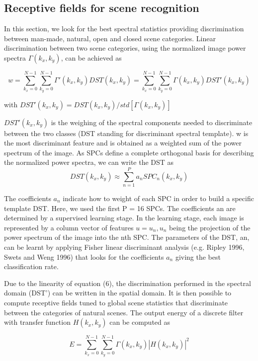 \documentclass{article}
\begin{document}
\subsection{Receptive fields for scene recognition}

In this section, we look for the best spectral statistics providing discrimination between man-made, natural, open and closed scene categories. Linear discrimination between two scene categories, using the normalized image power spectra $\Gamma(k_x, k_y)$, can be achieved as

\begin{equation}
   w = \sum^{N-1}_{k_x=0} \sum^{N-1}_{k_y=0} \Gamma'(k_x,k_y)DST(k_x,k_y) =  \sum^{N-1}_{k_x=0} \sum^{N-1}_{k_y=0} \Gamma(k_x,k_y)DST'(k_x,k_y)
\end{equation}

with $DST'(k_x,k_y)= DST(k_x,k_y)/std[\Gamma(k_x,k_y)]$

$DST'(k_x,k_y)$ is the weighing of the spectral components needed to discriminate between the two classes (DST standing for discriminant spectral template). w is the most discriminant feature and is obtained as a weighted sum of the power spectrum of the image. As SPCs define
a complete orthogonal basis for describing the normalized power spectra, we can write the DST as
\begin{equation}
    DST(k_x,k_y) \approx \sum^P_{n=1} a_n SPC_n(k_x,k_y)
\end{equation}

The coefficients $a_n$ indicate how to weight of each SPC in order to build a specific template
DST. Here, we used the first P = 16 SPCs. The coefficients an are determined by a supervised
learning stage. In the learning stage, each image is represented by a column vector of features
$u = {u_n}, u_n$ being the projection of the power spectrum of the image into the nth SPC.  The parameters of the DST, an, can be learnt by applying Fisher linear discriminant analysis (e.g. Ripley 1996,
Swets and Weng 1996) that looks for the coefficients $a_n$ giving the best classification rate.

Due to the linearity of equation (6), the discrimination performed in the
spectral domain (DST') can be written in the spatial domain. It is then possible to compute
receptive fields tuned to global scene statistics that discriminate between the categories of
natural scenes.
The output energy of a discrete filter with transfer function $H(k_x, k_y)$ can be computed as

\begin{equation}
   E = \sum^{N-1}_{k_x=0} \sum^{N-1}_{k_y=0} \Gamma(k_x,k_y)|H(k_x,k_y)|^2
\end{equation}
\end{document}
